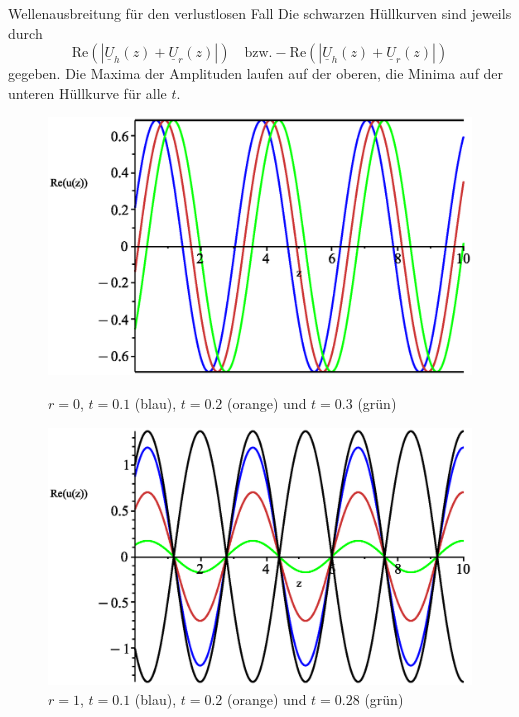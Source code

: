 \documentclass{beamer}
\begin{document}
\begin{frame}{Wellenausbreitung für den verlustlosen Fall}
    Die schwarzen Hüllkurven sind jeweils durch
    \[
    \mathrm{Re} ( \left| \underline{U}_{h}(z) + \underline{U}_{r}(z) \right| )
    \quad \text{bzw.}
    - \mathrm{Re} ( \left| \underline{U}_{h}(z) + \underline{U}_{r}(z) \right| )
    \] gegeben. Die Maxima der Amplituden laufen auf der oberen, die Minima auf der unteren Hüllkurve für alle $t$.
    \begin{figure}[H]
        \begin{minipage}{0.32\textwidth}
            \centering
            \includegraphics[width=\linewidth]{../graphics/Enveloppe/verlustlos/R0}
            \caption*{$r=0$, $t=0.1$ (blau), $t=0.2$ (orange) und $t=0.3$ (grün)}
        \end{minipage}
        \hfill
        \begin{minipage}{0.32\textwidth}
            \centering
            \includegraphics[width=\linewidth]{../graphics/Enveloppe/verlustlos/R1}
            \caption*{$r=1$, $t=0.1$ (blau), $t=0.2$ (orange) und $t=0.28$ (grün)}

\end{minipage}
\end{figure}
\end{frame}
\end{document}
